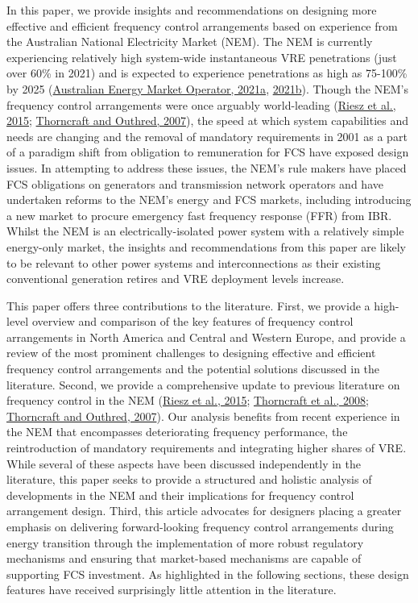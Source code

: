 \documentclass[12pt,a4paper,]{report}
\begin{document}
In this paper, we provide insights and recommendations on designing more
effective and efficient frequency control arrangements based on
experience from the Australian National Electricity Market (NEM). The
NEM is currently experiencing relatively high system-wide instantaneous
VRE penetrations (just over 60\% in 2021) and is expected to experience
penetrations as high as 75-100\% by 2025
(\protect\hyperlink{ref-australianenergymarketoperatorNEMEngineeringFramework2021}{Australian
Energy Market Operator, 2021a},
\protect\hyperlink{ref-australianenergymarketoperatorQuarterlyEnergyDynamics2021}{2021b}).
Though the NEM's frequency control arrangements were once arguably
world-leading
(\protect\hyperlink{ref-rieszFrequencyControlAncillary2015}{Riesz et
al., 2015};
\protect\hyperlink{ref-thorncraftExperienceMarketbasedAncillary2007}{Thorncraft
and Outhred, 2007}), the speed at which system capabilities and needs
are changing and the removal of mandatory requirements in 2001 as a part
of a paradigm shift from obligation to remuneration for FCS have exposed
design issues. In attempting to address these issues, the NEM's rule
makers have placed FCS obligations on generators and transmission
network operators and have undertaken reforms to the NEM's energy and
FCS markets, including introducing a new market to procure emergency
fast frequency response (FFR) from IBR. Whilst the NEM is an
electrically-isolated power system with a relatively simple energy-only
market, the insights and recommendations from this paper are likely to
be relevant to other power systems and interconnections as their
existing conventional generation retires and VRE deployment levels
increase.

This paper offers three contributions to the literature. First, we
provide a high-level overview and comparison of the key features of
frequency control arrangements in North America and Central and Western
Europe, and provide a review of the most prominent challenges to
designing effective and efficient frequency control arrangements and the
potential solutions discussed in the literature. Second, we provide a
comprehensive update to previous literature on frequency control in the
NEM (\protect\hyperlink{ref-rieszFrequencyControlAncillary2015}{Riesz et
al., 2015};
\protect\hyperlink{ref-thorncraftMarketbasedAncillaryServices2008}{Thorncraft
et al., 2008};
\protect\hyperlink{ref-thorncraftExperienceMarketbasedAncillary2007}{Thorncraft
and Outhred, 2007}). Our analysis benefits from recent experience in the
NEM that encompasses deteriorating frequency performance, the
reintroduction of mandatory requirements and integrating higher shares
of VRE. While several of these aspects have been discussed independently
in the literature, this paper seeks to provide a structured and holistic
analysis of developments in the NEM and their implications for frequency
control arrangement design. Third, this article advocates for designers
placing a greater emphasis on delivering forward-looking frequency
control arrangements during energy transition through the implementation
of more robust regulatory mechanisms and ensuring that market-based
mechanisms are capable of supporting FCS investment. As highlighted in
the following sections, these design features have received surprisingly
little attention in the literature.
\end{document}
